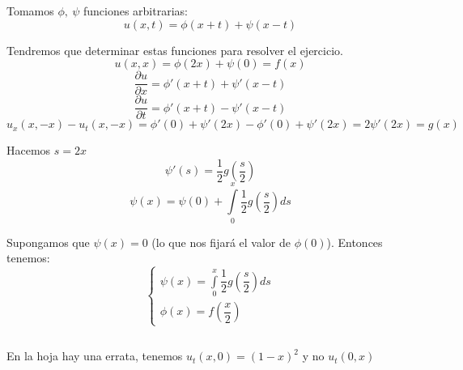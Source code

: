 \documentclass[openany]{book}
\begin{document}
\setcounter{ex}{0}

\begin{exercise}
  Tomamos $ \phi,\ \psi $ funciones arbitrarias:
  $$ u(x,t) = \phi(x+t) + \psi(x-t) $$

  Tendremos que determinar estas funciones para resolver el ejercicio.
  $$ u(x,x) = \phi(2x)+\psi(0) = f(x) $$
  $$ \dfrac{\partial u}{\partial x} = \phi'(x+t)+\psi'(x-t) $$
  $$ \dfrac{\partial u}{\partial t} = \phi'(x+t)-\psi'(x-t) $$
  $$ u_{x}(x,-x)-u_{t}(x,-x) = \phi'(0)+\psi'(2x)-\phi'(0)+\psi'(2x) = 2\psi'(2x) = g(x) $$
  
  Hacemos $ s = 2x $
  $$ \psi'(s) = \dfrac{1}{2}g\left(\dfrac{s}{2}\right) $$
  $$ \psi(x) = \psi(0)+ \int\limits_{0}^{x}\dfrac{1}{2}g\left(\dfrac{s}{2}\right)ds $$

  Supongamos que $ \psi(x)=0 $ (lo que nos fijará el valor de $ \phi(0) $). Entonces tenemos:
  $$ \left\{
  \begin{array}{l}
    \psi(x) = \int\limits_{0}^{x}\dfrac{1}{2}g\left(\dfrac{s}{2}\right)ds\\ 
    \phi(x) = f\left(\dfrac{x}{2}\right)  
  \end{array}
  \right. $$


\end{exercise}
\setcounter{ex}{3}
\begin{exercise}
  $  $

  En la hoja hay una errata, tenemos $ u_{t}(x,0) = (1-x)^2 $ y no $ u_{t}(0,x) $
  
\end{exercise}
\end{document}
